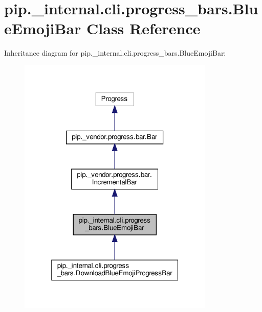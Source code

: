 \hypertarget{classpip_1_1__internal_1_1cli_1_1progress__bars_1_1BlueEmojiBar}{}\section{pip.\+\_\+internal.\+cli.\+progress\+\_\+bars.\+Blue\+Emoji\+Bar Class Reference}
\label{classpip_1_1__internal_1_1cli_1_1progress__bars_1_1BlueEmojiBar}


Inheritance diagram for pip.\+\_\+internal.\+cli.\+progress\+\_\+bars.\+Blue\+Emoji\+Bar\+:
\nopagebreak
\begin{figure}[H]
\begin{center}
\leavevmode
\includegraphics[width=265pt]{classpip_1_1__internal_1_1cli_1_1progress__bars_1_1BlueEmojiBar__inherit__graph}
\end{center}
\end{figure}


